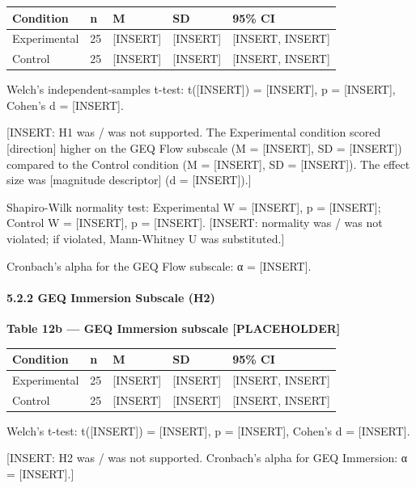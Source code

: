 \begin{longtable}[]{@{}lllll@{}}
\toprule\noalign{}
Condition & n & M & SD & 95\% CI \\
\midrule\noalign{}
\endhead
\bottomrule\noalign{}
\endlastfoot
Experimental & 25 & {[}INSERT{]} & {[}INSERT{]} & {[}INSERT,
INSERT{]} \\
Control & 25 & {[}INSERT{]} & {[}INSERT{]} & {[}INSERT, INSERT{]} \\
\end{longtable}

Welch's independent-samples t-test: t({[}INSERT{]}) = {[}INSERT{]}, p =
{[}INSERT{]}, Cohen's d = {[}INSERT{]}.

{[}INSERT: H1 was / was not supported. The Experimental condition scored
{[}direction{]} higher on the GEQ Flow subscale (M = {[}INSERT{]}, SD =
{[}INSERT{]}) compared to the Control condition (M = {[}INSERT{]}, SD =
{[}INSERT{]}). The effect size was {[}magnitude descriptor{]} (d =
{[}INSERT{]}).{]}

Shapiro-Wilk normality test: Experimental W = {[}INSERT{]}, p =
{[}INSERT{]}; Control W = {[}INSERT{]}, p = {[}INSERT{]}. {[}INSERT:
normality was / was not violated; if violated, Mann-Whitney U was
substituted.{]}

Cronbach's alpha for the GEQ Flow subscale: α = {[}INSERT{]}.

\paragraph{5.2.2 GEQ Immersion Subscale
(H2)}\label{geq-immersion-subscale-h2}

\textbf{Table 12b --- GEQ Immersion subscale {[}PLACEHOLDER{]}}

\begin{longtable}[]{@{}lllll@{}}
\toprule\noalign{}
Condition & n & M & SD & 95\% CI \\
\midrule\noalign{}
\endhead
\bottomrule\noalign{}
\endlastfoot
Experimental & 25 & {[}INSERT{]} & {[}INSERT{]} & {[}INSERT,
INSERT{]} \\
Control & 25 & {[}INSERT{]} & {[}INSERT{]} & {[}INSERT, INSERT{]} \\
\end{longtable}

Welch's t-test: t({[}INSERT{]}) = {[}INSERT{]}, p = {[}INSERT{]},
Cohen's d = {[}INSERT{]}.

{[}INSERT: H2 was / was not supported. Cronbach's alpha for GEQ
Immersion: α = {[}INSERT{]}.{]}

